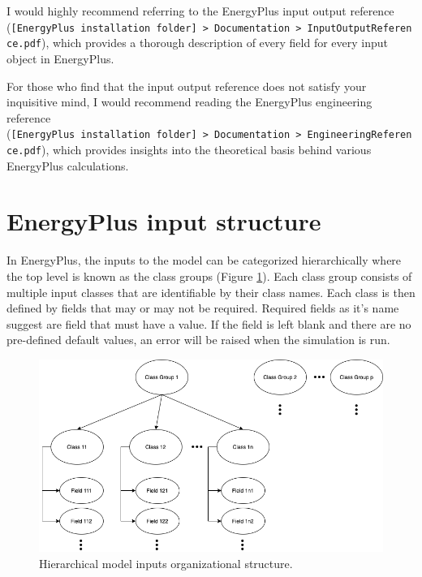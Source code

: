 \documentclass[
]{book}
\begin{document}
I would highly recommend referring to the EnergyPlus input output reference (\texttt{{[}EnergyPlus\ installation\ folder{]}\ \textgreater{}\ Documentation\ \textgreater{}\ InputOutputReference.pdf}), which provides a thorough description of every field for every input object in EnergyPlus.

For those who find that the input output reference does not satisfy your inquisitive mind, I would recommend reading the EnergyPlus engineering reference (\texttt{{[}EnergyPlus\ installation\ folder{]}\ \textgreater{}\ Documentation\ \textgreater{}\ EngineeringReference.pdf}), which provides insights into the theoretical basis behind various EnergyPlus calculations.

\hypertarget{energyplus-input-structure}{%
\section{EnergyPlus input structure}\label{energyplus-input-structure}}

In EnergyPlus, the inputs to the model can be categorized hierarchically where the top level is known as the class groups (Figure \ref{fig:group-class-field}). Each class group consists of multiple input classes that are identifiable by their class names. Each class is then defined by fields that may or may not be required. Required fields as it's name suggest are field that must have a value. If the field is left blank and there are no pre-defined default values, an error will be raised when the simulation is run.

\begin{figure}

{\centering \includegraphics[width=0.8\linewidth]{figures/group_class_field} 

}

\caption{Hierarchical model inputs organizational structure.}\label{fig:group-class-field}
\end{figure}
\end{document}
